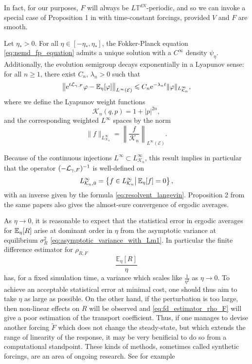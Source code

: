 In fact, for our purposes, $F$ will always be $L\mathbb{T}^{dN}$-periodic, and so we can invoke a special case of Proposition 1 in \cite{JPS15} with time-constant forcings, provided $V$ and $F$ are smooth.
\begin{theorem}\label{thm:nemd_exst_invariant_measure}
    Let $\eta_*>0$. For all $\eta\in[-\eta_*,\eta_*]$, the Fokker-Planck equation \eqref{eq:nemd_fp_equation} admits a unique solution with a $C^\infty$ density $\psi_\eta$.
    Additionally, the evolution semigroup decays exponentially in a Lyapunov sense: for all $n\geq 1$, there exist $C_n,\,\lambda_n>0$ such that
    \begin{equation}
        \label{eq:lyapunov_exp_decay}
        \left\|\mathrm{e}^{t\mathcal{L}_{\gamma,F}}\varphi-\mathbb{E}_\eta[\varphi]\right\|_{L^{\infty}(\mathcal E)}\leqslant C_n\mathrm{e}^{-\lambda_n t}\|\varphi\|_{L^\infty_{\mathcal K_n}},
    \end{equation}
    where we define the Lyapunov weight functions
    \[\mathcal K_n(q,p)=1+|p|^{2n},\]
    and the corresponding weighted $L^{\infty}$ spaces by the norm
    \[\|f\|_{L^\infty_{\mathcal K_n}}=\left\|\frac{f}{\mathcal K_n}\right\|_{L^\infty(\mathcal E)}.\]
\end{theorem}
Because of the continuous injections $L^\infty \subset L^\infty_{\mathcal K_n}$, this result implies in particular that the operator 
$(-\mathcal{L}_{\gamma,F})^{-1}$ is well-defined on 
\[L^\infty_{\mathcal K_n,0}=\left\{f\in L^\infty_{\mathcal K_n}\middle|\,\mathbb{E}_\eta[f]=0\right\},\]
with an inverse given by the formula \eqref{eq:resolvent_langevin}. Proposition 2 from the same papers also gives the almost-sure convergence of ergodic averages.
 \begin{remark}\label{rem:linear_regime}
    As $\eta \to 0$, it is reasonable to expect that the statistical error in ergodic averages for
    $\mathbb{E}_\eta[R]$ arise at dominant order in $\eta$ from the asymptotic variance at equilibrium $\sigma^2_R$ \eqref{eq:asymptotic_variance_with_Lm1}.
    In particular the finite difference estimator for $\rho_{R,F}$
    \begin{equation}
        \label{eq:fd_estimator_rho_F}
        \frac{\mathbb{E}_\eta[R]}{\eta}
    \end{equation}
    has, for a fixed simulation time, a variance which scales like $\frac1{\eta^2}$ as $\eta\to 0$.
    To achieve an acceptable statistical error at minimal cost, one should thus aim to take $\eta$ as large as possible.
    On the other hand, if the perturbation is too large, then non-linear effects on $R$ will be observed and \eqref{eq:fd_estimator_rho_F} 
    will give a poor estimation of the transport coefficient.
    Thus, if one manages to devise another forcing $\tilde F$ which does not change the steady-state, but which extends the range of linearity of the response,
    it may be very benificial to do so from a computational standpoint. These kinds of methods, sometimes called synthetic forcings, are an area of ongoing research. See for example \cite[]{EM08}
 \end{remark}
